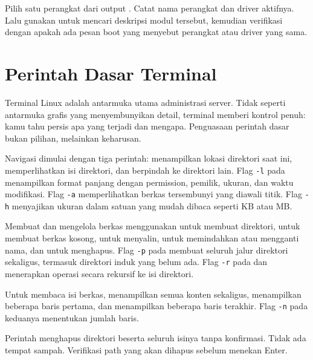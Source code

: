 \begin{challengebox}
Pilih satu perangkat dari output . Catat nama perangkat dan driver aktifnya. Lalu gunakan  untuk mencari deskripsi modul tersebut, kemudian verifikasi dengan  apakah ada pesan boot yang menyebut perangkat atau driver yang sama.
\end{challengebox}

\section{Perintah Dasar Terminal}
\label{sec:basic-commands}

Terminal Linux adalah antarmuka utama administrasi server. Tidak seperti antarmuka grafis yang menyembunyikan detail, terminal memberi kontrol penuh: kamu tahu persis apa yang terjadi dan mengapa. Penguasaan perintah dasar bukan pilihan, melainkan keharusan.

Navigasi dimulai dengan tiga perintah:  menampilkan lokasi direktori saat ini,  memperlihatkan isi direktori, dan  berpindah ke direktori lain. Flag \texttt{-l} pada  menampilkan format panjang dengan permission, pemilik, ukuran, dan waktu modifikasi. Flag \texttt{-a} memperlihatkan berkas tersembunyi yang diawali titik. Flag \texttt{-h} menyajikan ukuran dalam satuan yang mudah dibaca seperti KB atau MB.

Membuat dan mengelola berkas menggunakan  untuk membuat direktori,  untuk membuat berkas kosong,  untuk menyalin,  untuk memindahkan atau mengganti nama, dan  untuk menghapus. Flag \texttt{-p} pada  membuat seluruh jalur direktori sekaligus, termasuk direktori induk yang belum ada. Flag \texttt{-r} pada  dan  menerapkan operasi secara rekursif ke isi direktori.

Untuk membaca isi berkas,  menampilkan semua konten sekaligus,  menampilkan beberapa baris pertama, dan  menampilkan beberapa baris terakhir. Flag \texttt{-n} pada keduanya menentukan jumlah baris.

\begin{warningbox}
Perintah  menghapus direktori beserta seluruh isinya tanpa konfirmasi. Tidak ada tempat sampah. Verifikasi path yang akan dihapus sebelum menekan Enter.
\end{warningbox}

